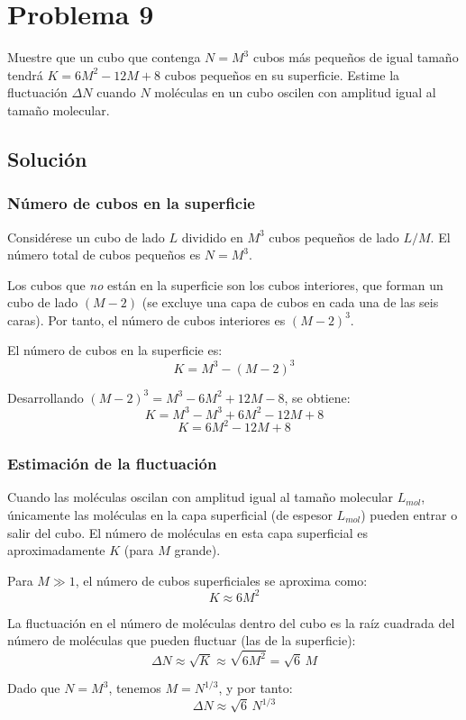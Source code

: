\documentclass[a4paper]{article}
\begin{document}
\section{Problema 9}
Muestre que un cubo que contenga $N = M^3$ cubos más pequeños de igual tamaño tendrá $K = 6M^2 - 12M + 8$ cubos pequeños en su superficie. Estime la fluctuación $\Delta N$ cuando $N$ moléculas en un cubo oscilen con amplitud igual al tamaño molecular.

\subsection{Solución}

\subsubsection{Número de cubos en la superficie}

Considérese un cubo de lado $L$ dividido en $M^3$ cubos pequeños de lado $L/M$. El número total de cubos pequeños es $N = M^3$.

Los cubos que \emph{no} están en la superficie son los cubos interiores, que forman un cubo de lado $(M-2)$ (se excluye una capa de cubos en cada una de las seis caras). Por tanto, el número de cubos interiores es $(M-2)^3$.

El número de cubos en la superficie es:
$$
K = M^3 - (M-2)^3
$$

Desarrollando $(M-2)^3 = M^3 - 6M^2 + 12M - 8$, se obtiene:
$$
K = M^3 - M^3 + 6M^2 - 12M + 8
$$
$$
\boxed{K = 6M^2 - 12M + 8}
$$

\subsubsection{Estimación de la fluctuación}

Cuando las moléculas oscilan con amplitud igual al tamaño molecular $L_{mol}$, únicamente las moléculas en la capa superficial (de espesor $L_{mol}$) pueden entrar o salir del cubo. El número de moléculas en esta capa superficial es aproximadamente $K$ (para $M$ grande).

Para $M \gg 1$, el número de cubos superficiales se aproxima como:
$$
K \approx 6M^2
$$

La fluctuación en el número de moléculas dentro del cubo es la raíz cuadrada del número de moléculas que pueden fluctuar (las de la superficie):
$$
\Delta N \approx \sqrt{K} \approx \sqrt{6M^2} = \sqrt{6}\, M
$$

Dado que $N = M^3$, tenemos $M = N^{1/3}$, y por tanto:
$$
\boxed{\Delta N \approx \sqrt{6}\, N^{1/3}}
$$
\end{document}
